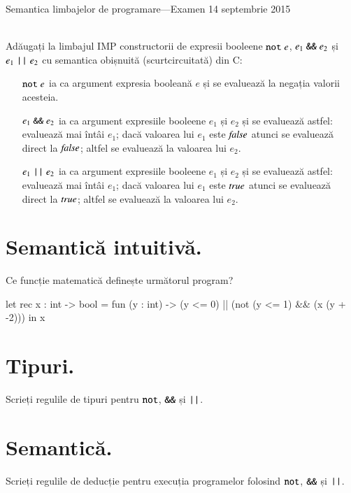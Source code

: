 \documentclass[addpoints,12pt,a4paper,answers]{exam}
\begin{document}
\begin{center}


Semantica limbajelor de programare---Examen \hfill  14 septembrie 2015 \\ \ \\

\end{center}


\begin{questions}
Adăugați la limbajul IMP constructorii de expresii booleene $\mathrel{\text{\ttfamily not}} e$, $e_1 \mathrel{\text{\ttfamily \&\&}} e_2$ și $e_1 \mathrel{\text{\ttfamily ||}} e_2$ cu semantica obișnuită (scurtcircuitată) din C:
\begin{itemize}
  \item[$\mathrel{\text{\ttfamily not}} e$] ia ca argument expresia booleană $e$ și se evaluează la negația valorii acesteia.
  \item[$e_1 \mathrel{\text{\ttfamily \&\&}} e_2$] ia ca argument expresiile booleene $e_1$ și $e_2$ și se evaluează astfel: evaluează mai întâi $e_1$; dacă valoarea lui $e_1$ este ${\it false}$ atunci se evaluează direct la ${\it false}$; altfel se evaluează la valoarea lui $e_2$.
  \item[$e_1 \mathrel{\text{\ttfamily ||}} e_2$] ia ca argument expresiile booleene $e_1$ și $e_2$ și se evaluează astfel: evaluează mai întâi $e_1$; dacă valoarea lui $e_1$ este ${\it true}$ atunci se evaluează direct la ${\it true}$; altfel se evaluează la valoarea lui $e_2$.
\end{itemize}
\begin{parts}
\part[1] {\bf Semantică intuitivă. } Ce funcție matematică definește următorul program?%
\begin{asciiml}
let rec x : int -> bool = 
  fun (y : int) -> (y <= 0) || (not (y <= 1) && (x (y + -2)))
in x
\end{asciiml}
\part[1] {\bf Tipuri. } Scrieți regulile de tipuri pentru $\mathrel{\text{\ttfamily not}}$, $\mathrel{\text{\ttfamily \&\&}}$ și $\mathrel{\text{\ttfamily ||}}$.
\part[1] {\bf Semantică. } Scrieți regulile de deducție pentru execuția programelor folosind $\mathrel{\text{\ttfamily not}}$, $\mathrel{\text{\ttfamily \&\&}}$ și $\mathrel{\text{\ttfamily ||}}$. 

\end{parts}
\end{questions}
\end{document}
